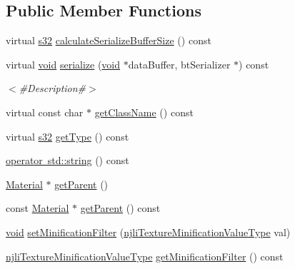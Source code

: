 \subsection*{Public Member Functions}
\begin{DoxyCompactItemize}
\item 
virtual \mbox{\hyperlink{_util_8h_aa62c75d314a0d1f37f79c4b73b2292e2}{s32}} \mbox{\hyperlink{classnjli_1_1_material_property_a888f05d2a7c7db1d701aeedc41390943}{calculate\+Serialize\+Buffer\+Size}} () const
\item 
virtual \mbox{\hyperlink{_thread_8h_af1e856da2e658414cb2456cb6f7ebc66}{void}} \mbox{\hyperlink{classnjli_1_1_material_property_a5338183b33812c774e246c9d1827d666}{serialize}} (\mbox{\hyperlink{_thread_8h_af1e856da2e658414cb2456cb6f7ebc66}{void}} $\ast$data\+Buffer, bt\+Serializer $\ast$) const
\begin{DoxyCompactList}\small\item\em $<$\#\+Description\#$>$ \end{DoxyCompactList}\item 
virtual const char $\ast$ \mbox{\hyperlink{classnjli_1_1_material_property_a10e4f8c062f12361638445530f82bd69}{get\+Class\+Name}} () const
\item 
virtual \mbox{\hyperlink{_util_8h_aa62c75d314a0d1f37f79c4b73b2292e2}{s32}} \mbox{\hyperlink{classnjli_1_1_material_property_aad6d725e907d46679f9aeac68f91ff42}{get\+Type}} () const
\item 
\mbox{\hyperlink{classnjli_1_1_material_property_a3ab43fdd4f1a6dd76f5e8e468c1be923}{operator std\+::string}} () const
\item 
\mbox{\hyperlink{classnjli_1_1_material}{Material}} $\ast$ \mbox{\hyperlink{classnjli_1_1_material_property_a1c30fb90512ef7eef66f4571d34fc42e}{get\+Parent}} ()
\item 
const \mbox{\hyperlink{classnjli_1_1_material}{Material}} $\ast$ \mbox{\hyperlink{classnjli_1_1_material_property_ab401ed5ab389a124afe832ff9a67777b}{get\+Parent}} () const
\item 
\mbox{\hyperlink{_thread_8h_af1e856da2e658414cb2456cb6f7ebc66}{void}} \mbox{\hyperlink{classnjli_1_1_material_property_a252a4ebb78f314af5eeec14ebd794692}{set\+Minification\+Filter}} (\mbox{\hyperlink{namespacenjli_a980b62f11da3b7143a525012cb512bac}{njli\+Texture\+Minification\+Value\+Type}} val)
\item 
\mbox{\hyperlink{namespacenjli_a980b62f11da3b7143a525012cb512bac}{njli\+Texture\+Minification\+Value\+Type}} \mbox{\hyperlink{classnjli_1_1_material_property_adbfec558090c7a6091b23a0ee4ad0c76}{get\+Minification\+Filter}} () const

\end{DoxyCompactItemize}
